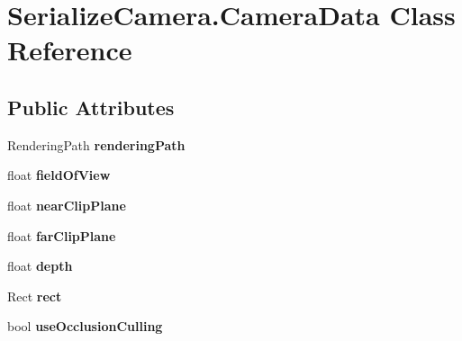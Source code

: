 \hypertarget{class_serialize_camera_1_1_camera_data}{}\section{Serialize\+Camera.\+Camera\+Data Class Reference}
\label{class_serialize_camera_1_1_camera_data}
\subsection*{Public Attributes}
\begin{DoxyCompactItemize}
\item 
\mbox{\label{class_serialize_camera_1_1_camera_data_acfeb7b1fdb6a04f4f350de588bf3d79c}} 
Rendering\+Path {\bfseries rendering\+Path}
\item 
\mbox{\label{class_serialize_camera_1_1_camera_data_a9811f76f15039e682cf6dd5afb1fde96}} 
float {\bfseries field\+Of\+View}
\item 
\mbox{\label{class_serialize_camera_1_1_camera_data_aa752f22384c985d27cd88bea7f66aa85}} 
float {\bfseries near\+Clip\+Plane}
\item 
\mbox{\label{class_serialize_camera_1_1_camera_data_a2579af1f7b6d436a9afcc7bf2d0f921a}} 
float {\bfseries far\+Clip\+Plane}
\item 
\mbox{\label{class_serialize_camera_1_1_camera_data_a17cf2413e805d8c7a2d2c52ee7539979}} 
float {\bfseries depth}
\item 
\mbox{\label{class_serialize_camera_1_1_camera_data_ad93a6b0b6ed3a2dd54ad408a0618d397}} 
Rect {\bfseries rect}
\item 
\mbox{\label{class_serialize_camera_1_1_camera_data_a7b60a827f405d9fe8f5a267400ef0dee}} 
bool {\bfseries use\+Occlusion\+Culling}
\item 
\mbox{\label{class_serialize_camera_1_1_camera_data_af3b1d7fdb89139a360d9454cb8629d48}} 

\end{DoxyCompactItemize}
